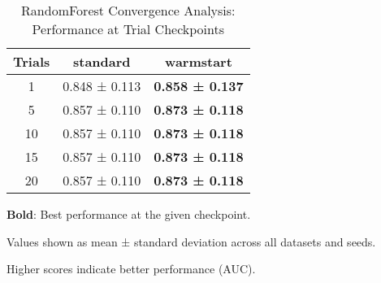 \begin{table}[htbp]
\centering
\caption{RandomForest Convergence Analysis: Performance at Trial Checkpoints}
\label{tab:randomforest_convergence}
\begin{tabular}{ccc}
\toprule
Trials & standard & warmstart \\
\midrule
1 & 0.848 ± 0.113 & \textbf{0.858 ± 0.137} \\
5 & 0.857 ± 0.110 & \textbf{0.873 ± 0.118} \\
10 & 0.857 ± 0.110 & \textbf{0.873 ± 0.118} \\
15 & 0.857 ± 0.110 & \textbf{0.873 ± 0.118} \\
20 & 0.857 ± 0.110 & \textbf{0.873 ± 0.118} \\
\bottomrule
\end{tabular}
\begin{tablenotes}
\small
\item \textbf{Bold}: Best performance at the given checkpoint.
\item Values shown as mean ± standard deviation across all datasets and seeds.
\item Higher scores indicate better performance (AUC).
\end{tablenotes}
\end{table}